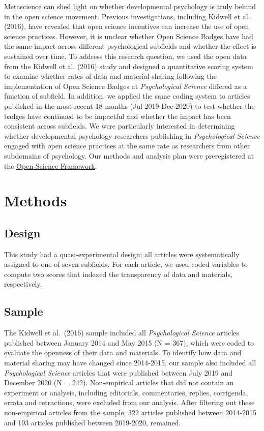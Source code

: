 \documentclass[
  english,
  man,floatsintext]{apa6}
\begin{document}
Metascience can shed light on whether developmental psychology is truly behind in the open science movement. Previous investigations, including Kidwell et al. (2016), have revealed that open science incentives can increase the use of open science practices. However, it is unclear whether Open Science Badges have had the same impact across different psychological subfields and whether the effect is sustained over time. To address this research question, we used the open data from the Kidwell et al. (2016) study and designed a quantitative scoring system to examine whether rates of data and material sharing following the implementation of Open Science Badges at \emph{Psychological Science} differed as a function of subfield. In addition, we applied the same coding system to articles published in the most recent 18 months (Jul 2019-Dec 2020) to test whether the badges have continued to be impactful and whether the impact has been consistent across subfields. We were particularly interested in determining whether developmental psychology researchers publishing in \emph{Psychological Science} engaged with open science practices at the same rate as researchers from other subdomains of psychology. Our methods and analysis plan were preregistered at the \href{https://osf.io/gqv9n/?view_only=b97cd4c4f6d645bc9e8870d97b6f3da4}{Open Science Framework}.

\hypertarget{methods}{%
\section{Methods}\label{methods}}

\hypertarget{design}{%
\subsection{Design}\label{design}}

This study had a quasi-experimental design; all articles were systematically assigned to one of seven subfields. For each article, we used coded variables to compute two scores that indexed the transparency of data and materials, respectively.

\hypertarget{sample}{%
\subsection{Sample}\label{sample}}

The Kidwell et al.~(2016) sample included all \emph{Psychological Science} articles published between January 2014 and May 2015 (N = 367), which were coded to evaluate the openness of their data and materials. To identify how data and material sharing may have changed since 2014-2015, our sample also included all \emph{Psychological Science} articles that were published between July 2019 and December 2020 (N = 242). Non-empirical articles that did not contain an experiment or analysis, including editorials, commentaries, replies, corrigenda, errata and retractions, were excluded from our analysis. After filtering out these non-empirical articles from the sample, 322 articles published between 2014-2015 and 193 articles published between 2019-2020, remained.
\end{document}
